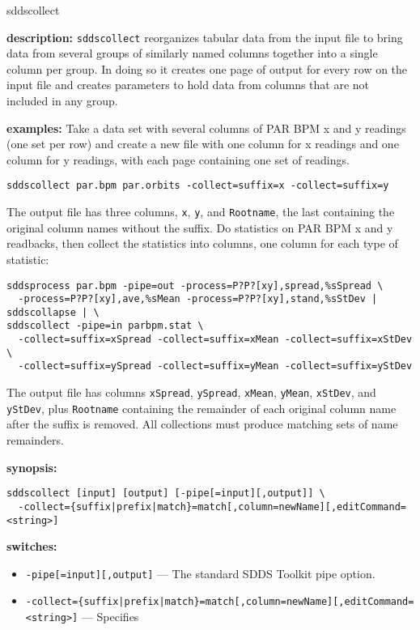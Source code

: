 \begin{sddsprog}{sddscollect}
  \item \textbf{description:}
    \verb|sddscollect| reorganizes tabular data from the input file to bring data from several groups of
    similarly named columns together into a single column per group. In doing so it creates one page
    of output for every row on the input file and creates parameters to hold data from columns that
    are not included in any group.
  \item \textbf{examples:}
    Take a data set with several columns of PAR BPM x and y readings (one set per row) and create a
    new file with one column for x readings and one column for y readings, with each page containing
    one set of readings.
    \begin{verbatim}
sddscollect par.bpm par.orbits -collect=suffix=x -collect=suffix=y
    \end{verbatim}
    The output file has three columns, \verb|x|, \verb|y|, and \verb|Rootname|, the last containing the
    original column names without the suffix.
    Do statistics on PAR BPM x and y readbacks, then collect the statistics into columns, one column
    for each type of statistic:
    \begin{verbatim}
sddsprocess par.bpm -pipe=out -process=P?P?[xy],spread,%sSpread \
  -process=P?P?[xy],ave,%sMean -process=P?P?[xy],stand,%sStDev | sddscollapse | \
sddscollect -pipe=in parbpm.stat \
  -collect=suffix=xSpread -collect=suffix=xMean -collect=suffix=xStDev \
  -collect=suffix=ySpread -collect=suffix=yMean -collect=suffix=yStDev
    \end{verbatim}
    The output file has columns \verb|xSpread|, \verb|ySpread|, \verb|xMean|, \verb|yMean|,
    \verb|xStDev|, and \verb|yStDev|, plus \verb|Rootname| containing the remainder of each original
    column name after the suffix is removed. All collections must produce matching sets of name
    remainders.
  \item \textbf{synopsis:}
    \begin{verbatim}
sddscollect [input] [output] [-pipe[=input][,output]] \
  -collect={suffix|prefix|match}=match[,column=newName][,editCommand=<string>]
    \end{verbatim}
  \item \textbf{switches:}
    \begin{itemize}
      \item \verb|-pipe[=input][,output]| --- The standard SDDS Toolkit pipe option.
      \item \verb!-collect={suffix|prefix|match}=match[,column=newName][,editCommand=<string>]! --- Specifies

\end{itemize}
\end{sddsprog}
